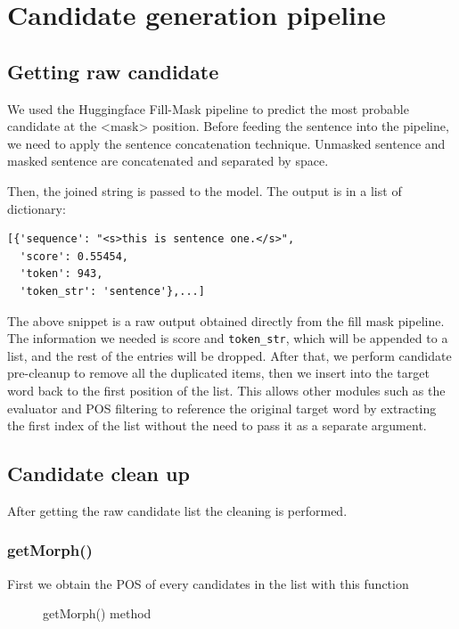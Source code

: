 \documentclass[12pt,oneside,openright,a4paper]{cpe-english-project}
\begin{document}
\section{Candidate generation pipeline}

\subsection{Getting raw candidate}
We used the Huggingface Fill-Mask pipeline to predict the most probable candidate at the <mask> position. Before feeding the sentence into the pipeline, we need to apply the sentence concatenation technique. Unmasked sentence and masked sentence are concatenated and separated by space. 

Then, the joined string is passed to the model. The output is in a list of dictionary:



\begin{verbatim}
[{'sequence': "<s>this is sentence one.</s>",
  'score': 0.55454,
  'token': 943,
  'token_str': 'sentence'},...]
\end{verbatim}

The above snippet is a raw output obtained directly from the fill mask pipeline. The information we needed is score and \verb/token_str/, which will be appended to a list, and the rest of the entries will be dropped. After that, we perform candidate pre-cleanup to remove all the duplicated items, then we insert into the target word back to the first position of the list. This allows other modules such as the evaluator and POS filtering to reference the original target word by extracting the first index of the list without the need to pass it as a separate argument. 

\subsection{Candidate clean up}
After getting the raw candidate list the cleaning is performed.
\subsubsection{getMorph()}
First we obtain the POS of every candidates in the list with this function 
\begin{figure}[!h]\centering
\setlength{\fboxrule}{0.2mm} %
\setlength{\fboxsep}{1cm}
\caption{getMorph() method}\label{fig:getMorph() method}
\end{figure}
\end{document}
